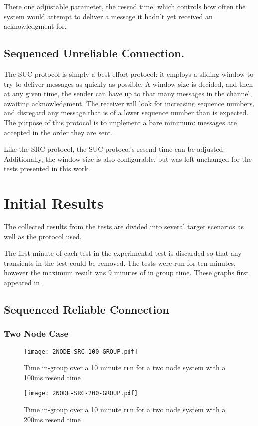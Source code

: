 There one adjustable parameter, the resend time, which controls how often the system would attempt to deliver a message it hadn't yet received an acknowledgment for.

\subsection{Sequenced Unreliable Connection.}

The SUC protocol is simply a best effort protocol: it employs a sliding window to try to deliver messages as quickly as possible. A window size is decided, and then at any given time, the sender can have up to that many messages in the channel, awaiting acknowledgment. The receiver will look for increasing sequence numbers, and disregard any message that is of a lower sequence number than is expected. The purpose of this protocol is to implement a bare minimum: messages are accepted in the order they are sent.

Like the SRC protocol, the SUC protocol's resend time can be adjusted. Additionally, the window size is also configurable, but was left unchanged for the tests presented in this work.

\section{Initial Results}

The collected results from the tests are divided into several target scenarios as well as the protocol used.

The first minute of each test in the experimental test is discarded so that any transients in the test could be removed.
The tests were run for ten minutes, however the maximum result was 9 minutes of in group time.
These graphs first appeared in \cite{CRITIS2012}.

\subsection{Sequenced Reliable Connection}

\subsubsection{Two Node Case}

\begin{figure}
\centering
\begin{minipage}{0.45\textwidth}
    \centering
    \texttt{[image: 2NODE-SRC-100-GROUP.pdf]}
    \caption{Time in-group over a 10 minute run for a two node system with a 100ms resend time}
    \label{fig:IGT-SRC-2NODE-100}
\end{minipage}%
\qquad
\begin{minipage}{0.45\textwidth}
    \centering
    \texttt{[image: 2NODE-SRC-200-GROUP.pdf]}
    \caption{Time in-group over a 10 minute run for a two node system with a 200ms resend time}
    \label{fig:IGT-SRC-2NODE-200}
\end{minipage}
\end{figure}

